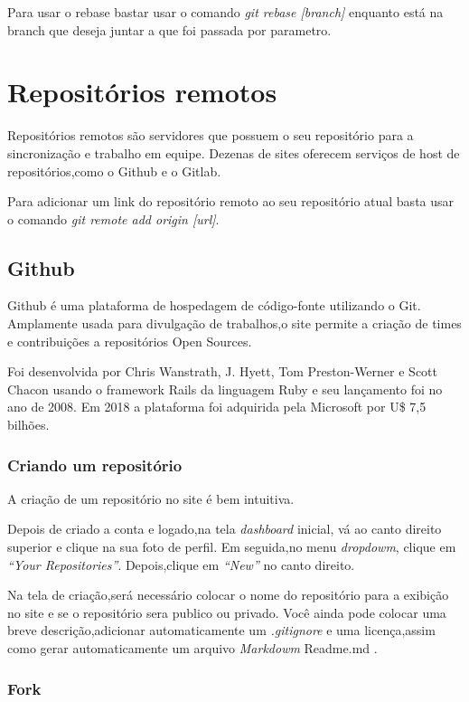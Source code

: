 \documentclass[]{article}
\begin{document}
Para usar o rebase bastar usar o comando \textit{git rebase [branch]} enquanto está na branch que deseja juntar a que foi passada por parametro.


\section{Repositórios remotos}

Repositórios remotos são servidores que possuem o seu repositório para a sincronização e trabalho em equipe.
 Dezenas de sites oferecem serviços de host de repositórios,como o Github e o Gitlab.
 
 Para adicionar um link do repositório remoto ao seu repositório atual basta usar o comando \textit{git remote add origin [url]}.
 \subsection*{Github}
Github é uma plataforma de hospedagem de código-fonte utilizando o Git.
Amplamente usada para divulgação de trabalhos,o site permite a criação de times e contribuições a repositórios Open Sources.

Foi desenvolvida por Chris Wanstrath, J. Hyett, Tom Preston-Werner e Scott Chacon usando o framework Rails da linguagem Ruby e seu lançamento foi no ano de 2008.
Em 2018 a plataforma foi adquirida pela Microsoft por U\$ 7,5 bilhões.
\subsubsection*{Criando um repositório}
A criação de um repositório no site é bem intuitiva.

Depois de criado a conta e logado,na tela \textit{dashboard} inicial, vá ao canto direito superior e clique na sua foto de perfil.
Em seguida,no menu \textit{dropdowm}, clique em \textit{``Your Repositories''}.
Depois,clique em \textit{``New''} no canto direito.

Na tela de criação,será necessário colocar o nome do repositório para a exibição no site e se o repositório sera publico ou privado.
Você ainda pode colocar uma breve descrição,adicionar automaticamente um \textit{.gitignore} e uma licença,assim como gerar automaticamente um arquivo \textit{Markdowm} Readme.md .

\subsubsection*{Fork}
\end{document}

